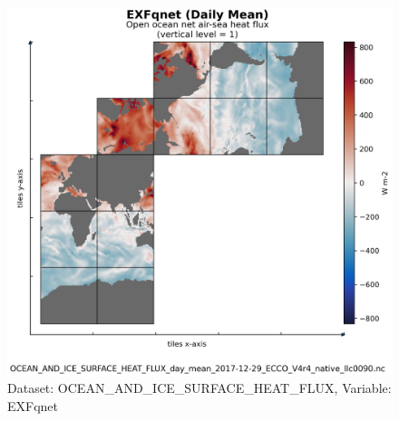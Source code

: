 \begin{figure}[H]
\centering
\includegraphics[scale=0.55]{../images/plots/native_plots/Ocean_and_Sea-Ice_Surface_Heat_Fluxes/EXFqnet.png}
\caption{Dataset: OCEAN\_AND\_ICE\_SURFACE\_HEAT\_FLUX, Variable: EXFqnet}
\label{tab:table-OCEAN_AND_ICE_SURFACE_HEAT_FLUX_EXFqnet-Plot}
\end{figure}
\newpage
\pagebreak
